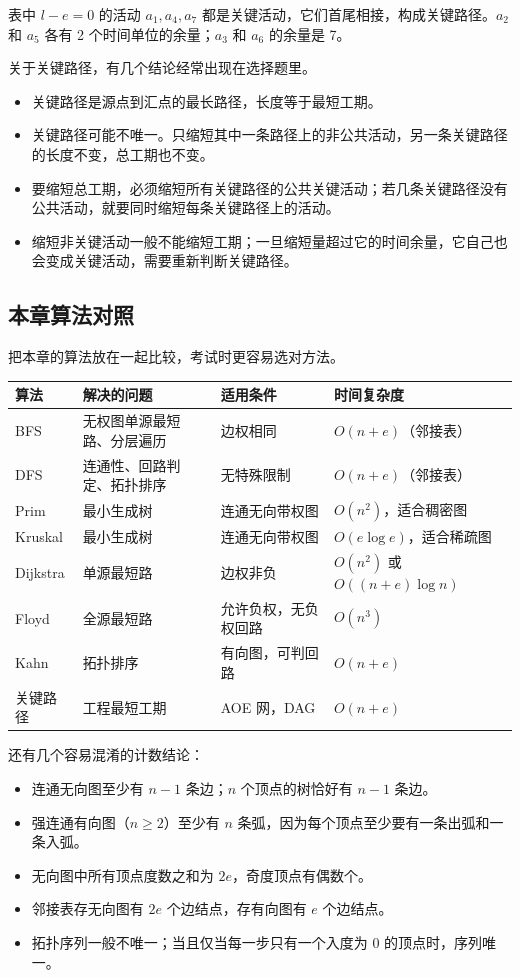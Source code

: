 表中 $l-e=0$ 的活动 $a_1,a_4,a_7$ 都是关键活动，它们首尾相接，构成关键路径。$a_2$ 和 $a_5$ 各有 2 个时间单位的余量；$a_3$ 和 $a_6$ 的余量是 7。

关于关键路径，有几个结论经常出现在选择题里。

\begin{itemize}
  \item 关键路径是源点到汇点的最长路径，长度等于最短工期。
  \item 关键路径可能不唯一。只缩短其中一条路径上的非公共活动，另一条关键路径的长度不变，总工期也不变。
  \item 要缩短总工期，必须缩短所有关键路径的公共关键活动；若几条关键路径没有公共活动，就要同时缩短每条关键路径上的活动。
  \item 缩短非关键活动一般不能缩短工期；一旦缩短量超过它的时间余量，它自己也会变成关键活动，需要重新判断关键路径。
\end{itemize}

\subsection{本章算法对照}

把本章的算法放在一起比较，考试时更容易选对方法。

\begin{center}
\small
\begin{tabular}{llll}
\toprule
算法 & 解决的问题 & 适用条件 & 时间复杂度 \\
\midrule
BFS & 无权图单源最短路、分层遍历 & 边权相同 & $O(n+e)$（邻接表） \\
DFS & 连通性、回路判定、拓扑排序 & 无特殊限制 & $O(n+e)$（邻接表） \\
Prim & 最小生成树 & 连通无向带权图 & $O(n^2)$，适合稠密图 \\
Kruskal & 最小生成树 & 连通无向带权图 & $O(e\log e)$，适合稀疏图 \\
Dijkstra & 单源最短路 & 边权非负 & $O(n^2)$ 或 $O((n+e)\log n)$ \\
Floyd & 全源最短路 & 允许负权，无负权回路 & $O(n^3)$ \\
Kahn & 拓扑排序 & 有向图，可判回路 & $O(n+e)$ \\
关键路径 & 工程最短工期 & AOE 网，DAG & $O(n+e)$ \\
\bottomrule
\end{tabular}
\end{center}

还有几个容易混淆的计数结论：

\begin{itemize}
  \item 连通无向图至少有 $n-1$ 条边；$n$ 个顶点的树恰好有 $n-1$ 条边。
  \item 强连通有向图（$n\geqslant 2$）至少有 $n$ 条弧，因为每个顶点至少要有一条出弧和一条入弧。
  \item 无向图中所有顶点度数之和为 $2e$，奇度顶点有偶数个。
  \item 邻接表存无向图有 $2e$ 个边结点，存有向图有 $e$ 个边结点。
  \item 拓扑序列一般不唯一；当且仅当每一步只有一个入度为 0 的顶点时，序列唯一。
\end{itemize}

